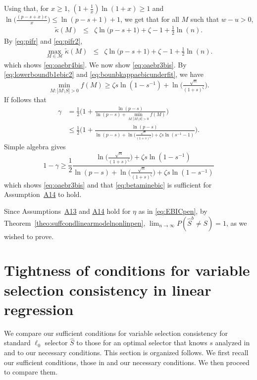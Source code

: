 \documentclass[bj,authoryear]{imsart}
\theoremstyle{plain}
\newcommand{\M}{\mathcal{M}}
\begin{document}
Using that, for $x\geq 1$, $(1+\frac{1}{x})\ln(1+x)\geq 1$ and $\ln\Big(\frac{(p-s+x)e}{x}\Big)\leq \ln(p-s+1)+1$, we get that for all $M$ such that $w-u>0$,
\begin{eqnarray}\label{eq:pifr2}
     \tilde{\kappa}(M) &\leq& \zeta\ln\big(p-s+1\big)+\zeta-1+\frac{1}{2}\ln(n).
 \end{eqnarray}
By \eqref{eq:pifr} and \eqref{eq:pifr2},
 \begin{eqnarray*}
     \max_{M\in\M}\tilde{\kappa}(M)  &\leq& \zeta\ln\big(p-s+1\big)+\zeta-1+\frac{1}{2}\ln(n).
 \end{eqnarray*}
which shows \eqref{eq:oaebr4bis}. We now show \eqref{eq:oaebr3bis}. By \eqref{eq:lowerboundb1ebic2} and \eqref{eq:bounbkappaebicunderfit}, we have
$$\min_{M: |M\setminus S|>0}f(M) \geq \zeta s\ln(1-s^{-1})+ \ln \big(\tfrac{\sqrt{n}}{(1+s)^{\zeta}}\big).$$
If follows that
 \begin{align*}
 \gamma&=\frac12\Big(1+\frac{\ln(p-s)}{\ln(p-s)+\min_{M: |M\setminus S|>0}f(M)}\Big) \\&\leq \frac12\Big(1+\frac{\ln(p-s)}{\ln(p-s)+ \ln \big(\tfrac{\sqrt{n}}{(1+s)^{\zeta}}\big)+\zeta s\ln(s^{-1}-1)}\Big).
 \end{align*}
 Simple algebra gives
  \begin{equation*}
 1-\gamma\geq \frac12\frac{ \ln \big(\tfrac{\sqrt{n}}{(1+s)^{\zeta}}\big)+\zeta s\ln(1-s^{-1})}{\ln(p-s)+ \ln \big(\tfrac{\sqrt{n}}{(1+s)^{\zeta}}\big)+\zeta s\ln(1-s^{-1})}
 \end{equation*}
 which shows \eqref{eq:oaebr3bis} and that \eqref{eq:betaminebic} is sufficient for  Assumption~\hyperlink{lab:A14}{A14} to hold.
 
 Since Assumptions~\hyperlink{lab:A13}{A13} and \hyperlink{lab:A14}{A14} hold for $\eta$ as in \eqref{eq:EBICpen}, by Theorem~\ref{theo:suffcondlinearmodelnonlinpen}, $\lim_{n\to\infty}P(\hat{S}^{b}\neq S)= 1$, as we wished to prove.


\section{Tightness of conditions for variable selection consistency in linear regression}\label{suppsec:tightness}

We compare our sufficient conditions for variable selection consistency for standard $\ell_0$ selector $\hat{S}$ to those for an optimal selector that knows $s$ analyzed in \cite{infotheowainwright} and to our necessary conditions. This section is organized follows. We first recall our sufficient conditions, those in \cite{infotheowainwright} and our necessary conditions. We then proceed to compare them.
\end{document}
